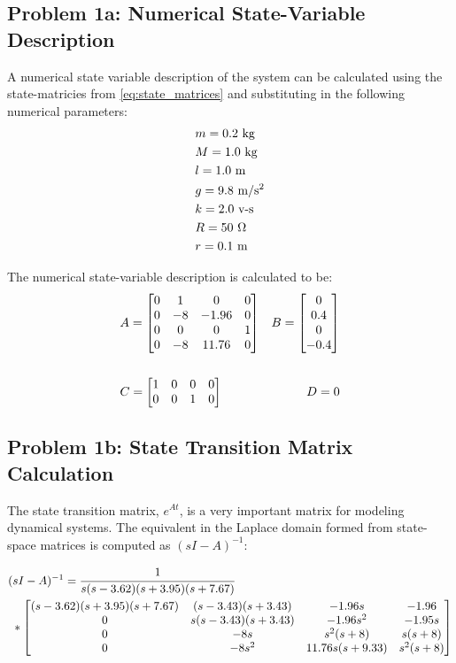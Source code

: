 \documentclass[]{article}
\begin{document}
	\subsection{Problem 1a: Numerical State-Variable Description}
		A numerical state variable description of the system can be calculated using the state-matricies from \eqref{eq:state_matrices} and substituting in the following numerical parameters:
		\begin{align*}
			&m = 0.2 \ \text{kg} \\
			&M = 1.0 \ \text{kg} \\
			&l = 1.0 \ \text{m} \\
			&g = 9.8 \ \text{m/s\textsuperscript{2}} \\
			&k = 2.0 \ \text{v-s} \\
			&R = 50  \ \Omega \\
			&r = 0.1 \ \text{m}
		\end{align*}
		
		The numerical state-variable description is calculated to be:
		\begin{equation}
			\begin{aligned}
				&A = \mqty[	0 & 1 	& 0 	& 0\\
							0 & -8	& -1.96 & 0 \\
							0 & 0	& 0 	& 1\\
							0 & -8	& 11.76	& 0	]
				&B = \mqty[	0\\
							0.4\\
							0\\
							-0.4] \\ && \\
				&C = \mqty[	1 & 0 & 0 & 0\\
							0 & 0 & 1 & 0]
				&D = 0
			\end{aligned}
			\label{eq:pendulum_state_matrices}
		\end{equation}
	
	\subsection{Problem 1b: State Transition Matrix Calculation}
		The state transition matrix, $e^{At}$, is a very important matrix for modeling dynamical systems. The equivalent in the Laplace domain formed from state-space matrices is computed as $(sI - A)^{-1}$:
		
		\begin{equation}
			\begin{aligned}
				&(sI - A)^{-1} = \cfrac{1}{s (s-3.62) (s + 3.95) (s + 7.67)} \\
				&\ *\mqty[	(s - 3.62) (s + 3.95) (s + 7.67)	&(s - 3.43) (s + 3.43)		&-1.96 s			&-1.96\\
							0									&s (s - 3.43) (s + 3.43)	&-1.96 s^2			&-1.95 s\\
							0									&-8 s						&s^2 (s+8)			&s (s+8)\\
							0									&-8 s^2						&11.76 s (s+9.33)	&s^2 (s+8)
				]
			\end{aligned}
			\label{eq:pendulum_(sI-A)-1}
		\end{equation}
		
\end{document}

